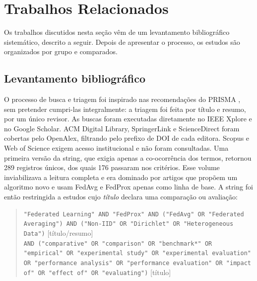 \section{Trabalhos Relacionados}
\label{sec:trabalhos}

Os trabalhos discutidos nesta seção vêm de um levantamento bibliográfico sistemático, descrito a seguir. Depois de apresentar o processo, os estudos são organizados por grupo e comparados.

\subsection{Levantamento bibliográfico}

O processo de busca e triagem foi inspirado nas recomendações do PRISMA \citep{page2021prisma}, sem pretender cumpri-las integralmente: a triagem foi feita por título e resumo, por um único revisor. As buscas foram executadas diretamente no IEEE Xplore e no Google Scholar. ACM Digital Library, SpringerLink e ScienceDirect foram cobertas pelo OpenAlex, filtrando pelo prefixo de DOI de cada editora. Scopus e Web of Science exigem acesso institucional e não foram consultadas. Uma primeira versão da string, que exigia apenas a co-ocorrência dos termos, retornou 289 registros únicos, dos quais 176 passaram nos critérios. Esse volume inviabilizava a leitura completa e era dominado por artigos que propõem um algoritmo novo e usam FedAvg e FedProx apenas como linha de base. A string foi então restringida a estudos cujo \emph{título} declara uma comparação ou avaliação:

\begin{quote}\small
\texttt{"Federated Learning" AND "FedProx" AND ("FedAvg" OR "Federated Averaging") AND ("Non-IID" OR "Dirichlet" OR "Heterogeneous Data")} [título/resumo]\\
\texttt{AND ("comparative" OR "comparison" OR "benchmark*" OR "empirical" OR "experimental study" OR "experimental evaluation" OR "performance analysis" OR "performance evaluation" OR "impact of" OR "effect of" OR "evaluating")} [título]
\end{quote}

